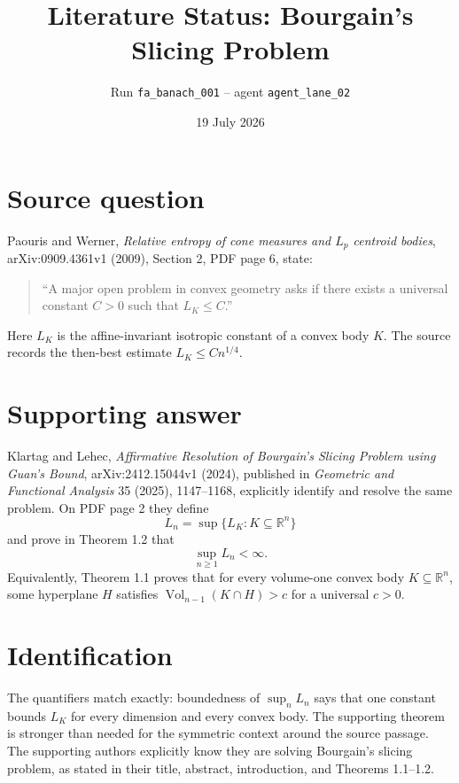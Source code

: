 \documentclass[11pt]{article}
\title{Literature Status: Bourgain's Slicing Problem}
\author{Run \texttt{fa\_banach\_001} -- agent \texttt{agent\_lane\_02}}
\date{19 July 2026}
\begin{document}
\maketitle

\begin{center}
\end{center}

\section*{Source question}

Paouris and Werner, \emph{Relative entropy of cone measures and
$L_p$ centroid bodies}, arXiv:0909.4361v1 (2009), Section 2, PDF page 6,
state:
\begin{quote}
``A major open problem in convex geometry asks if there exists a universal
constant $C>0$ such that $L_K\leq C$.''
\end{quote}
Here $L_K$ is the affine-invariant isotropic constant of a convex body $K$.
The source records the then-best estimate $L_K\leq Cn^{1/4}$.

\section*{Supporting answer}

Klartag and Lehec, \emph{Affirmative Resolution of Bourgain's Slicing
Problem using Guan's Bound}, arXiv:2412.15044v1 (2024), published in
\emph{Geometric and Functional Analysis} 35 (2025), 1147--1168, explicitly
identify and resolve the same problem. On PDF page 2 they define
\[
  L_n=\sup\{L_K:K\subseteq\mathbb{R}^n\}
\]
and prove in Theorem 1.2 that
\[
  \sup_{n\geq 1} L_n<\infty.
\]
Equivalently, Theorem 1.1 proves that for every volume-one convex body
$K\subseteq\mathbb{R}^n$, some hyperplane $H$ satisfies
$\operatorname{Vol}_{n-1}(K\cap H)>c$ for a universal $c>0$.

\newpage
\section*{Identification}

The quantifiers match exactly: boundedness of $\sup_n L_n$ says that one
constant bounds $L_K$ for every dimension and every convex body. The
supporting theorem is stronger than needed for the symmetric context around
the source passage. The supporting authors explicitly know they are solving
Bourgain's slicing problem, as stated in their title, abstract, introduction,
and Theorems 1.1--1.2.
\end{document}
